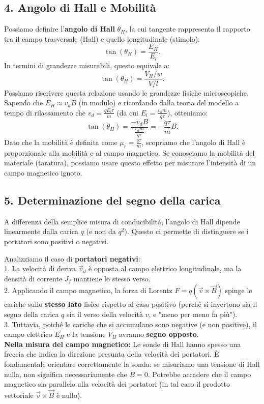 \documentclass{book}
\begin{document}
\subsection*{4. Angolo di Hall e Mobilità}
Possiamo definire l'\textbf{angolo di Hall} \(\theta_H\), la cui tangente rappresenta il rapporto tra il campo trasversale (Hall) e quello longitudinale (stimolo):
\[
\tan(\theta_H) = \frac{E_H}{E_l}.
\]
In termini di grandezze misurabili, questo equivale a:
\[
\tan(\theta_H) = \frac{V_H / w}{V / l}.
\]
Possiamo riscrivere questa relazione usando le grandezze fisiche microscopiche. Sapendo che \(E_H \approx v_d B\) (in modulo) e ricordando dalla teoria del modello a tempo di rilassamento che \(v_d = \frac{q E_l \tau}{m}\) (da cui \(E_l = \frac{v_d m}{q\tau}\)), otteniamo:
\[
\tan(\theta_H) = \frac{-v_d B}{\frac{v_d m}{q\tau}} = -\frac{q\tau}{m} B.
\]
Dato che la mobilità è definita come \(\mu_r = \frac{q\tau}{m}\), scopriamo che l'angolo di Hall è proporzionale alla mobilità e al campo magnetico.
Se conosciamo la mobilità del materiale (taratura), possiamo usare questo effetto per misurare l'intensità di un campo magnetico ignoto.

\subsection*{5. Determinazione del segno della carica}
A differenza della semplice misura di conducibilità, l'angolo di Hall dipende linearmente dalla carica \(q\) (e non da \(q^2\)). Questo ci permette di distinguere se i portatori sono positivi o negativi.

Analizziamo il caso di \textbf{portatori negativi}:
\\
1. La velocità di deriva \(\vec{v}_d\) è opposta al campo elettrico longitudinale, ma la densità di corrente \(J_f\) mantiene lo stesso verso.
\\
2. Applicando il campo magnetico, la forza di Lorentz \(F = q(\vec{v} \times \vec{B})\) spinge le cariche sullo \textbf{stesso lato} fisico rispetto al caso positivo (perché si invertono sia il segno della carica \(q\) sia il verso della velocità \(v\), e "meno per meno fa più").
\\
3. Tuttavia, poiché le cariche che si accumulano sono negative (e non positive), il campo elettrico \(E_H\) e la tensione \(V_H\) avranno \textbf{segno opposto}.
\\
\textbf{Nella misura del campo magnetico:}
Le sonde di Hall hanno spesso una freccia che indica la direzione presunta della velocità dei portatori. È fondamentale orientare correttamente la sonda: se misuriamo una tensione di Hall nulla, non significa necessariamente che \(B=0\). Potrebbe accadere che il campo magnetico sia parallelo alla velocità dei portatori (in tal caso il prodotto vettoriale \(\vec{v} \times \vec{B}\) è nullo).
\end{document}
